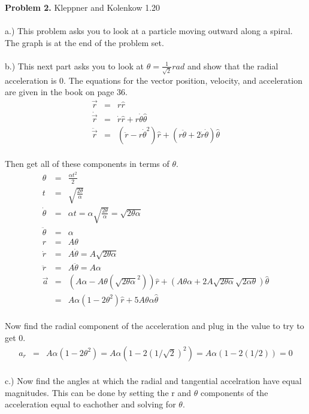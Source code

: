 \documentclass[11pt]{amsart}
\begin{document}
\textbf{Problem 2.} Kleppner and Kolenkow 1.20 \\ \\
a.) This problem asks you to look at a particle moving outward along a spiral. The graph is at the end of the problem set.  \\ \\
b.) This next part asks you to look at $\theta=\frac{1}{\sqrt{2}}rad$ and show that the radial acceleration is 0. The equations for the vector position, velocity, and acceleration are given in the book on page 36. \\
\begin{eqnarray*} 
\vec{r} &=& r\hat{r} \\
\dot{\vec{r}} &=& \dot{r}\hat{r} + r\dot{\theta}\hat{\theta} \\
\ddot{\vec{r}} &=& (\ddot{r}-r\dot{\theta}^{2})\hat{r} + (r\ddot{\theta}+2\dot{r}\dot{\theta})\hat{\theta} 
\end{eqnarray*} \\
Then get all of these components in terms of $\theta$. \\
\begin{eqnarray*}
\theta &=& \frac{\alpha{t^{2}}}{2} \\
t &=&  \sqrt{\frac{2\theta}{\alpha}} \\
\dot{\theta} &=& \alpha{t} = \alpha\sqrt{\frac{2\theta}{\alpha}} = \sqrt{2\theta\alpha} \\
\ddot{\theta} &=& \alpha \\ 
r &=& A\theta \\
\dot{r} &=& A\dot{\theta} = A \sqrt{2\theta\alpha} \\
\ddot{r} &=& A\ddot{\theta} = A\alpha \\
\vec{a}&=& (A\alpha-A\theta(\sqrt{2\theta\alpha}^{2}))\hat{r} + (A\theta\alpha+2A\sqrt{2\theta\alpha}\sqrt{2\alpha\theta})\hat{\theta} \\
&=& A\alpha(1-2\theta^{2})\hat{r} + 5A\theta\alpha\hat{\theta} 
\end{eqnarray*} \\
Now find the radial component of the acceleration and plug in the value to try to get 0. \\
\begin{eqnarray*}
a_{r} &=& A\alpha(1-2\theta^{2}) = A\alpha(1-2(1/\sqrt{2})^{2}) = A\alpha(1 - 2(1/2)) = 0 
\end{eqnarray*} \\
c.) Now find the angles at which the radial and tangential accelration have equal magnitudes. This can be done by setting the r and $\theta$ components of the acceleration equal to eachother and solving for $\theta$. \\
\end{document}
